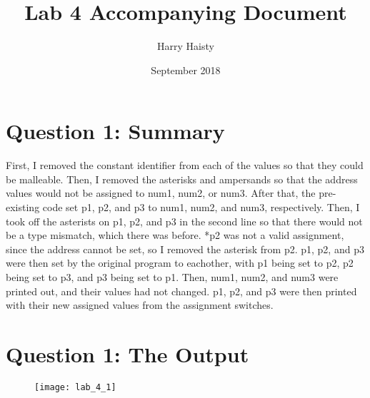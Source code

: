 \documentclass[11pt]{article}
\title{Lab 4 Accompanying Document}
\author{Harry Haisty}
\date{September 2018}
\begin{document}
\maketitle

\section*{Question 1: Summary}
First, I removed the constant identifier from each of the values so that they could be malleable. Then, I removed the asterisks and ampersands so that the address values would not be assigned to num1, num2, or num3. 
\newline
After that, the pre-existing code set p1, p2, and p3 to num1, num2, and num3, respectively. Then, I took off the asterists on p1, p2, and p3 in the second line so that there would not be a type mismatch, which there was before. 
\newline
*p2 was not a valid assignment, since the address cannot be set, so I removed the asterisk from p2. 
\newline
p1, p2, and p3 were then set by the original program to eachother, with p1 being set to p2, p2 being set to p3, and p3 being set to p1. 
\newline
Then, num1, num2, and num3 were printed out, and their values had not changed. p1, p2, and p3 were then printed with their new assigned values from the assignment switches. 

\section*{Question 1: The Output}
\begin{figure}[H]
    \centering
    \texttt{[image: lab\_4\_1]}
\end{figure}
\end{document}
